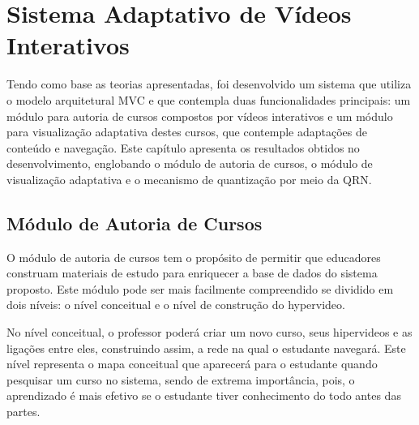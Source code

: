 \chapter[Sistema Adaptativo de Vídeos Interativos]{Sistema Adaptativo de Vídeos Interativos}

Tendo como base as teorias apresentadas, foi desenvolvido um sistema que utiliza o modelo arquitetural MVC e que contempla duas funcionalidades principais: um módulo para autoria de cursos compostos por vídeos interativos e um módulo para visualização adaptativa destes cursos, que contemple adaptações de conteúdo e navegação. Este capítulo apresenta os resultados obtidos no desenvolvimento, englobando o módulo de autoria de cursos, o módulo de visualização adaptativa e o mecanismo de quantização por meio da QRN.

\section{Módulo de Autoria de Cursos}

O módulo de autoria de cursos tem o propósito de permitir que educadores construam materiais de estudo para enriquecer a base de dados do sistema proposto. Este módulo pode ser mais facilmente compreendido se dividido em dois níveis: o nível conceitual e o nível de construção do hypervideo.

No nível conceitual, o professor poderá criar um novo curso, seus hipervideos e as ligações entre eles, construindo assim, a rede na qual o estudante navegará. Este nível representa o mapa conceitual que aparecerá para o estudante quando pesquisar um curso no sistema, sendo de extrema importância, pois, o aprendizado é mais efetivo se o estudante tiver conhecimento do todo antes das partes.

